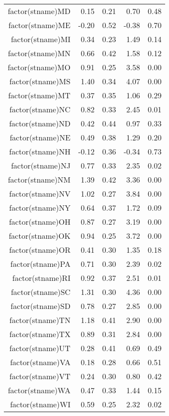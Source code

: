 \begin{table}[ht]
\begin{tabular}{rrrrr}
  factor(stname)MD & 0.15 & 0.21 & 0.70 & 0.48 \\ 
  factor(stname)ME & -0.20 & 0.52 & -0.38 & 0.70 \\ 
  factor(stname)MI & 0.34 & 0.23 & 1.49 & 0.14 \\ 
  factor(stname)MN & 0.66 & 0.42 & 1.58 & 0.12 \\ 
  factor(stname)MO & 0.91 & 0.25 & 3.58 & 0.00 \\ 
  factor(stname)MS & 1.40 & 0.34 & 4.07 & 0.00 \\ 
  factor(stname)MT & 0.37 & 0.35 & 1.06 & 0.29 \\ 
  factor(stname)NC & 0.82 & 0.33 & 2.45 & 0.01 \\ 
  factor(stname)ND & 0.42 & 0.44 & 0.97 & 0.33 \\ 
  factor(stname)NE & 0.49 & 0.38 & 1.29 & 0.20 \\ 
  factor(stname)NH & -0.12 & 0.36 & -0.34 & 0.73 \\ 
  factor(stname)NJ & 0.77 & 0.33 & 2.35 & 0.02 \\ 
  factor(stname)NM & 1.39 & 0.42 & 3.36 & 0.00 \\ 
  factor(stname)NV & 1.02 & 0.27 & 3.84 & 0.00 \\ 
  factor(stname)NY & 0.64 & 0.37 & 1.72 & 0.09 \\ 
  factor(stname)OH & 0.87 & 0.27 & 3.19 & 0.00 \\ 
  factor(stname)OK & 0.94 & 0.25 & 3.72 & 0.00 \\ 
  factor(stname)OR & 0.41 & 0.30 & 1.35 & 0.18 \\ 
  factor(stname)PA & 0.71 & 0.30 & 2.39 & 0.02 \\ 
  factor(stname)RI & 0.92 & 0.37 & 2.51 & 0.01 \\ 
  factor(stname)SC & 1.31 & 0.30 & 4.36 & 0.00 \\ 
  factor(stname)SD & 0.78 & 0.27 & 2.85 & 0.00 \\ 
  factor(stname)TN & 1.18 & 0.41 & 2.90 & 0.00 \\ 
  factor(stname)TX & 0.89 & 0.31 & 2.84 & 0.00 \\ 
  factor(stname)UT & 0.28 & 0.41 & 0.69 & 0.49 \\ 
  factor(stname)VA & 0.18 & 0.28 & 0.66 & 0.51 \\ 
  factor(stname)VT & 0.24 & 0.30 & 0.80 & 0.42 \\ 
  factor(stname)WA & 0.47 & 0.33 & 1.44 & 0.15 \\ 
  factor(stname)WI & 0.59 & 0.25 & 2.32 & 0.02 \\ 

\end{tabular}
\end{table}

